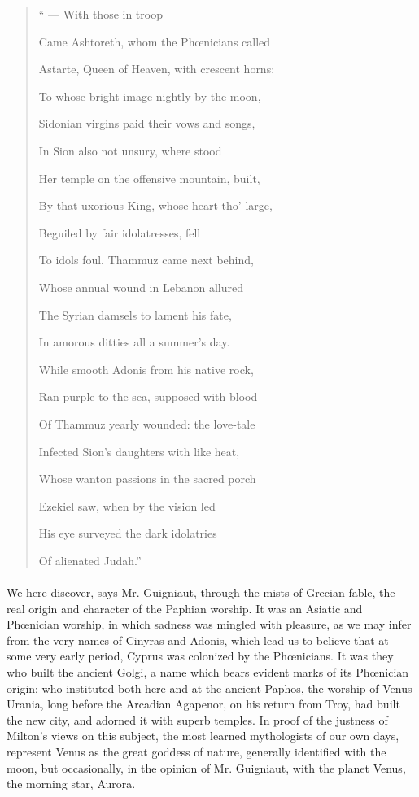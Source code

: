 \documentclass[a4paper, 11pt, oneside, polutonikogreek, english]{article}
\begin{document}
\begin{quotation}
`` --- With those in troop

Came Ashtoreth, whom the Phœnicians called

Astarte, Queen of Heaven, with crescent horns:

To whose bright image nightly by the moon,

Sidonian virgins paid their vows and songs,

In Sion also not unsury, where stood

Her temple on the offensive mountain, built,

By that uxorious King, whose heart tho' large,

Beguiled by fair idolatresses, fell

To idols foul. Thammuz came next behind,

Whose annual wound in Lebanon allured

The Syrian damsels to lament his fate,

In amorous ditties all a summer's day.

While smooth Adonis from his native rock,

Ran purple to the sea, supposed with blood

Of Thammuz yearly wounded: the love-tale

Infected Sion's daughters with like heat,

Whose wanton passions in the sacred porch

Ezekiel saw, when by the vision led

His eye surveyed the dark idolatries

Of alienated Judah.''
\end{quotation}
\paragraph{}
We here discover, says Mr. Guigniaut, through the mists of Grecian fable, the real origin and character of the Paphian worship. It was an Asiatic and Phœnician worship, in which sadness was mingled with pleasure, as we may infer from the very names of Cinyras and Adonis, which lead us to believe that at some very early period, Cyprus was colonized by the Phœnicians. It was they who built the ancient Golgi, a name which bears evident marks of its Phœnician origin; who instituted both here and at the ancient Paphos, the worship of Venus Urania, long before the Arcadian Agapenor, on his return from Troy, had built the new city, and adorned it with superb temples. In proof of the justness of Milton's views on this subject, the most learned mythologists of our own days, represent Venus as the great goddess of nature, generally identified with the moon, but occasionally, in the opinion of Mr. Guigniaut, with the planet Venus, the morning star, Aurora.
\end{document}
